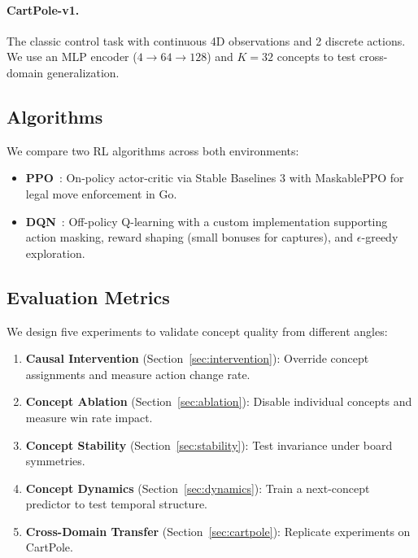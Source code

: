 \documentclass[11pt,a4paper]{article}
\begin{document}
\paragraph{CartPole-v1.}
The classic control task with continuous 4D observations and 2 discrete actions. We use an MLP encoder ($4 \to 64 \to 128$) and $K=32$ concepts to test cross-domain generalization.

\subsection{Algorithms}

We compare two RL algorithms across both environments:
\begin{itemize}[leftmargin=*]
    \item \textbf{PPO}~\citep{schulman2017proximal}: On-policy actor-critic via Stable Baselines 3 with MaskablePPO for legal move enforcement in Go.
    \item \textbf{DQN}~\citep{mnih2015human}: Off-policy Q-learning with a custom implementation supporting action masking, reward shaping (small bonuses for captures), and $\epsilon$-greedy exploration.
\end{itemize}

\subsection{Evaluation Metrics}

We design five experiments to validate concept quality from different angles:

\begin{enumerate}[leftmargin=*]
    \item \textbf{Causal Intervention} (Section~\ref{sec:intervention}): Override concept assignments and measure action change rate.
    \item \textbf{Concept Ablation} (Section~\ref{sec:ablation}): Disable individual concepts and measure win rate impact.
    \item \textbf{Concept Stability} (Section~\ref{sec:stability}): Test invariance under board symmetries.
    \item \textbf{Concept Dynamics} (Section~\ref{sec:dynamics}): Train a next-concept predictor to test temporal structure.
    \item \textbf{Cross-Domain Transfer} (Section~\ref{sec:cartpole}): Replicate experiments on CartPole.
\end{enumerate}
\end{document}
